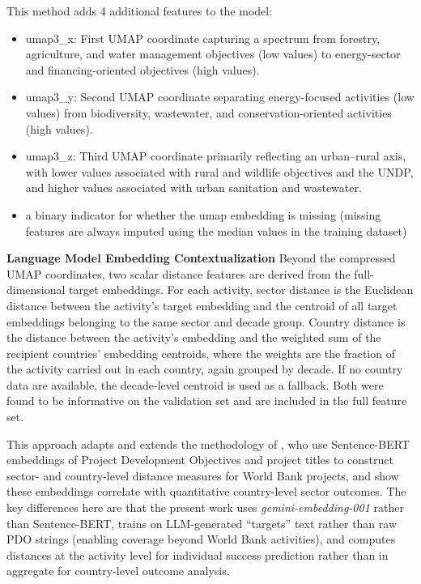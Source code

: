 \documentclass[12pt,a4paper]{article}
\let\citep\parencite
\begin{document}
This method adds 4 additional features to the model:
\begin{itemize}
  \item umap3\_x: First UMAP coordinate capturing a spectrum from forestry, agriculture, and water management objectives (low values) to energy-sector and financing-oriented objectives (high values).
  \item umap3\_y: Second UMAP coordinate separating energy-focused activities (low values) from biodiversity, wastewater, and conservation-oriented activities (high values).
  \item umap3\_z: Third UMAP coordinate primarily reflecting an urban–rural axis, with lower values associated with rural and wildlife objectives and the UNDP, and higher values associated with urban sanitation and wastewater.
  \item a binary indicator for whether the umap embedding is missing (missing features are always imputed using the median values in the training dataset)
\end{itemize}

\textbf{Language Model Embedding Contextualization}
Beyond the compressed UMAP coordinates, two scalar distance features are derived from the full-dimensional target embeddings. For each activity, sector distance is the Euclidean distance between the activity's target embedding and the centroid of all target embeddings belonging to the same sector and decade group. Country distance is the distance between the activity's embedding and the weighted sum of the recipient countries' embedding centroids, where the weights are the fraction of the activity carried out in each country, again grouped by decade. If no country data are available, the decade-level centroid is used as a fallback. Both were found to be informative on the validation set and are included in the full feature set.

This approach adapts and extends the methodology of \citep{goldembergMindingGapAid2025}, who use Sentence-BERT embeddings of Project Development Objectives and project titles to construct sector- and country-level distance measures for World Bank projects, and show these embeddings correlate with quantitative country-level sector outcomes. The key differences here are that the present work uses \emph{gemini-embedding-001} rather than Sentence-BERT, trains on LLM-generated ``targets'' text rather than raw PDO strings (enabling coverage beyond World Bank activities), and computes distances at the activity level for individual success prediction rather than in aggregate for country-level outcome analysis.
\end{document}
